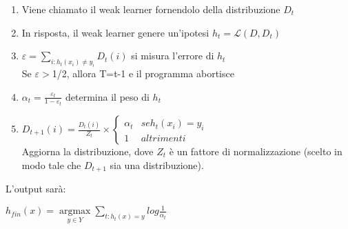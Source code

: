 \begin{enumerate}
\item Viene chiamato il weak learner fornendolo della distribuzione \begin{math} D_t\end{math}
\item In risposta, il weak learner 
genere un'ipotesi \begin{math} h_t=\mathcal{L}(D,D_t)\end{math} 
\item   \begin{math}\varepsilon = \sum_{i:h_t(x_i)\ne y_i}D_t(i)\end{math} si misura l'errore 
di \begin{math} h_t\end{math}\\
Se \begin{math}\varepsilon>\end{math}1/2, allora T=t-1 e il programma abortisce
                          
\item \begin{math} \alpha_t=\frac{\varepsilon_t}{1-\varepsilon_t}  \end{math} 
determina il peso di \begin{math} h_t\end{math}

\item \begin{math} D_{t+1}(i)=\frac{D_t(i)}{Z_t}\times \begin{cases} \alpha_t &  se  h_t(x_i)=y_i \\ 1 & altrimenti \end{cases}\end{math} \\
\newline
Aggiorna la distribuzione, dove \begin{math}Z_t \end{math} \`e un fattore di normalizzazione (scelto in 
modo tale che \begin{math}D_{t+1} \end{math}
sia una distribuzione).


\end{enumerate}
L'output sar\`a:
\begin{center}
\begin{math} h_{fin}(x)= \underset{y\in Y}{\operatorname{argmax}}\sum_{t:h_t(x)=y} log\frac{1}{\alpha_t} \end{math}
\end{center}








